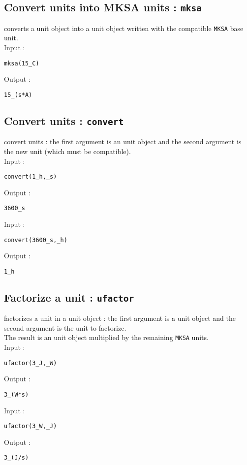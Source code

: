 \documentclass[a4paper,11pt]{book}
\begin{document}
\subsection{Convert units into MKSA  units : {\tt mksa}}
 converts a unit object into  a unit object
written with the compatible {\tt MKSA} base unit.\\ 
\noindent Input :
\begin{center}{\tt mksa(15\_C)}\end{center}
Output :
\begin{center}{\tt 15\_(s*A)}\end{center}

\subsection{Convert units : {\tt convert}}\label{sec:convertunit}
 convert units : the first argument is an unit object 
and the second argument is the new unit (which must be compatible).\\
Input :
\begin{center}{\tt convert(1\_h,\_s) }\end{center}
Output :
\begin{center}{\tt 3600\_s}\end{center}
Input :
\begin{center}{\tt convert(3600\_s,\_h) }\end{center}
Output :
\begin{center}{\tt 1\_h}\end{center}

\subsection{Factorize a unit : {\tt ufactor}}
 factorizes a unit in a unit object : the first 
argument is a unit object and the second argument is the unit to factorize.\\ 
The result is an unit object multiplied by the remaining {\tt MKSA} units.\\
Input :
\begin{center}{\tt ufactor(3\_J,\_W) }\end{center}
Output :
\begin{center}{\tt 3\_(W*s)}\end{center}
Input :
\begin{center}{\tt ufactor(3\_W,\_J) }\end{center}
Output :
\begin{center}{\tt 3\_(J/s)}\end{center}
\end{document}
